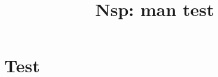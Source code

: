 \documentclass[11pt]{book}
\title{Nsp: man test } %
\begin{document}
\maketitle


\chapter{Test}


\end{document}
